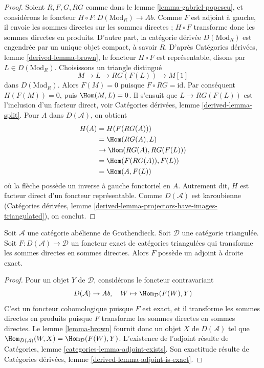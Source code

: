\begin{proof}
Soient $R, F, G, RG$ comme dans le lemme \ref{lemma-gabriel-popescu}, et
considérons le foncteur $H \circ F : D(\text{Mod}_R) \to \textit{Ab}$.
Comme $F$ est adjoint à gauche, il envoie les sommes directes sur les sommes
directes ; $H \circ F$ transforme donc les sommes directes en produits.
D'autre part, la catégorie dérivée $D(\text{Mod}_R)$ est engendrée par un
unique objet compact, à savoir $R$. D'après Catégories dérivées, lemme
\ref{derived-lemma-brown}, le foncteur $H \circ F$ est représentable, disons
par $L \in D(\text{Mod}_R)$. Choisissons un triangle distingué
$$
M \to L \to RG(F(L)) \to M[1]
$$
dans $D(\text{Mod}_R)$. Alors $F(M) = 0$ puisque
$F \circ RG = \text{id}$. Par conséquent $H(F(M)) = 0$, puis
$\Hom(M, L) = 0$. Il s'ensuit que $L \to RG(F(L))$ est l'inclusion d'un
facteur direct, voir Catégories dérivées, lemme \ref{derived-lemma-split}.
Pour $A$ dans $D(\mathcal{A})$, on obtient
\begin{align*}
H(A)
& =
H(F(RG(A))) \\
& =
\Hom(RG(A), L) \\
& \to
\Hom(RG(A), RG(F(L))) \\
& =
\Hom(F(RG(A)), F(L)) \\
& =
\Hom(A, F(L))
\end{align*}
où la flèche possède un inverse à gauche fonctoriel en $A$. Autrement dit,
$H$ est facteur direct d'un foncteur représentable. Comme $D(\mathcal{A})$
est karoubienne (Catégories dérivées, lemme
\ref{derived-lemma-projectors-have-images-triangulated}), on conclut.
\end{proof}

\begin{proposition}
\label{proposition-brown}
Soit $\mathcal{A}$ une catégorie abélienne de Grothendieck. Soit $\mathcal{D}$
une catégorie triangulée. Soit $F : D(\mathcal{A}) \to \mathcal{D}$ un
foncteur exact de catégories triangulées qui transforme les sommes directes en
sommes directes. Alors $F$ possède un adjoint à droite exact.
\end{proposition}

\begin{proof}
Pour un objet $Y$ de $\mathcal{D}$, considérons le foncteur contravariant
$$
D(\mathcal{A}) \to \textit{Ab},\quad
W \mapsto \Hom_\mathcal{D}(F(W), Y)
$$
C'est un foncteur cohomologique puisque $F$ est exact, et il transforme les
sommes directes en produits puisque $F$ transforme les sommes directes en
sommes directes. Le lemme \ref{lemma-brown} fournit donc un objet $X$ de
$D(\mathcal{A})$ tel que
$\Hom_{D(\mathcal{A})}(W, X) = \Hom_\mathcal{D}(F(W), Y)$.
L'existence de l'adjoint résulte de Catégories, lemme
\ref{categories-lemma-adjoint-exists}. Son exactitude résulte de Catégories
dérivées, lemme \ref{derived-lemma-adjoint-is-exact}.
\end{proof}


















